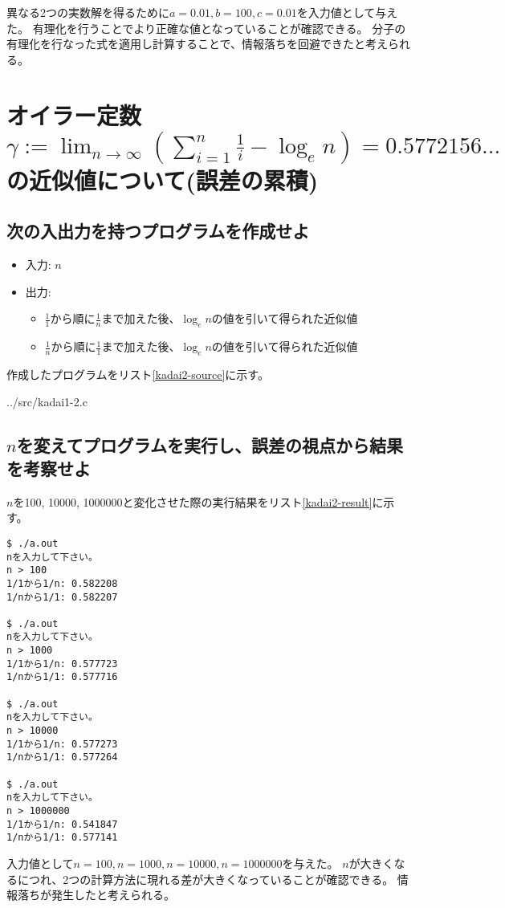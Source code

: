 \documentclass[]{jsarticle}
\begin{document}
異なる2つの実数解を得るために$a=0.01, b=100, c=0.01$を入力値として与えた。
有理化を行うことでより正確な値となっていることが確認できる。
分子の有理化を行なった式を適用し計算することで、情報落ちを回避できたと考えられる。


\section{オイラー定数$\gamma:=\lim_{n \to \infty} \left(\sum_{i=1}^{n} \frac{1}{i} - \log_{e} n\right)=0.5772156...$の近似値について(誤差の累積)}

\subsection{次の入出力を持つプログラムを作成せよ}

\begin{itemize}
\item 入力: $n$
\item 出力:
\begin{itemize}
\item $\frac{1}{1}$から順に$\frac{1}{n}$まで加えた後、$\log_{e} n$の値を引いて得られた近似値
\item $\frac{1}{n}$から順に$\frac{1}{1}$まで加えた後、$\log_{e} n$の値を引いて得られた近似値
\end{itemize}
\end{itemize}

作成したプログラムをリスト\ref{kadai2-source}に示す。


{../src/kadai1-2.c}

\subsection{$n$を変えてプログラムを実行し、誤差の視点から結果を考察せよ}

$n$を100, 10000, 1000000と変化させた際の実行結果をリスト\ref{kadai2-result}に示す。

\begin{lstlisting}[caption=実行結果,label=kadai2-result]
$ ./a.out
nを入力して下さい。
n > 100
1/1から1/n: 0.582208
1/nから1/1: 0.582207

$ ./a.out
nを入力して下さい。
n > 1000
1/1から1/n: 0.577723
1/nから1/1: 0.577716

$ ./a.out
nを入力して下さい。
n > 10000
1/1から1/n: 0.577273
1/nから1/1: 0.577264

$ ./a.out
nを入力して下さい。
n > 1000000
1/1から1/n: 0.541847
1/nから1/1: 0.577141
\end{lstlisting}

入力値として$n=100, n=1000, n=10000, n=1000000$を与えた。
$n$が大きくなるにつれ、2つの計算方法に現れる差が大きくなっていることが確認できる。
情報落ちが発生したと考えられる。
\end{document}
